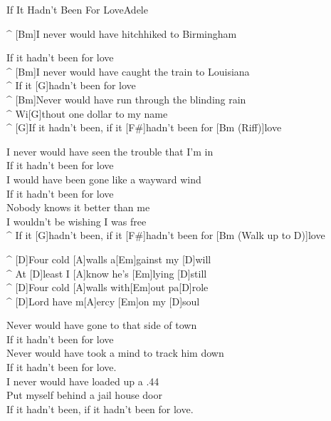 \begin{song}{If It Hadn't Been For Love}{Adele}

\begin{guitar}
^ [Bm]I never would have hitchhiked to Birmingham\\
\end{guitar}

\begin{guitar}
If it hadn't been for love\\
^ [Bm]I never would have caught the train to Louisiana\\
^ If it [G]hadn't been for love\\
^ [Bm]Never would have run through the blinding rain\\
^ Wi[G]thout one dollar to my name\\
^ [G]If it hadn't been, if it [F#]hadn't been for [Bm (Riff)]love\\
\end{guitar}

\begin{guitar}
I never would have seen the trouble that I'm in\\
If it hadn't been for love\\
I would have been gone like a wayward wind\\
If it hadn't been for love\\
Nobody knows it better than me\\
I wouldn't be wishing I was free\\
^ If it [G]hadn't been, if it [F#]hadn't been for [Bm (Walk up to D)]love\\
\end{guitar}

\begin{guitar}
^ [D]Four cold [A]walls a[Em]gainst my [D]will\\
^ At [D]least I [A]know he's [Em]lying [D]still\\
^ [D]Four cold [A]walls with[Em]out pa[D]role\\
^ [D]Lord have m[A]ercy [Em]on my [D]soul\\
\end{guitar}


\begin{guitar}
Never would have gone to that side of town\\
If it hadn't been for love\\
Never would have took a mind to track him down\\
If it hadn't been for love.\\
I never would have loaded up a .44\\
Put myself behind a jail house door\\
If it hadn't been, if it hadn't been for love.\\
\end{guitar}


\end{song}
